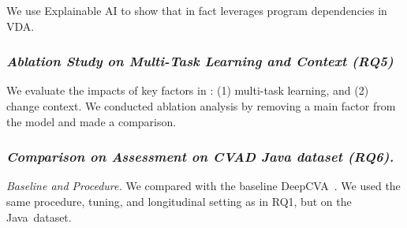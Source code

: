 We use Explainable AI to show that {\tool} in fact leverages program
dependencies in VDA.




\subsubsection{\bf \em Ablation Study on Multi-Task Learning and Context (RQ5)}

We evaluate the impacts of key factors in {\tool}: (1)
multi-task learning, and (2) change context. We conducted ablation analysis
by removing a main factor from the model and made a comparison.


\subsubsection{\bf \em Comparison on Assessment on CVAD Java dataset (RQ6).\\}

{\em Baseline and Procedure.} We compared {\tool} with the baseline
DeepCVA~\cite{deepCVA-ase21}. We used the same procedure, tuning, and
longitudinal setting as in RQ1, but on the Java~dataset.









